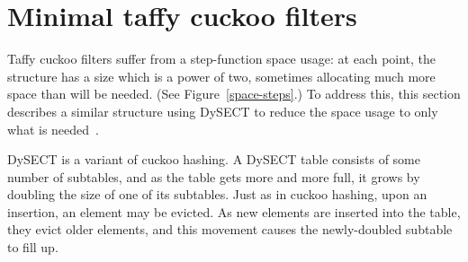 \documentclass[letterpaper,twocolumn,10pt]{article}
\newcommand{\ints}{\mathbb{Z}}
\begin{document}






\section{Minimal taffy cuckoo filters}
\label{mtcf}

Taffy cuckoo filters suffer from a step-function space usage:
at each point, the structure has a size which is a power of two, sometimes allocating much more space than will be needed. (See Figure~\ref{space-steps}.)
To address this, this section describes a similar structure using DySECT to reduce the space usage to only what is needed~\cite{dysect}.

DySECT is a variant of cuckoo hashing.
A DySECT table consists of some number of subtables, and as the table gets more and more full, it grows by doubling the size of one of its subtables.
Just as in cuckoo hashing, upon an insertion, an element may be evicted.
As new elements are inserted into the table, they evict older elements, and this movement causes the newly-doubled subtable to fill up.
\end{document}

